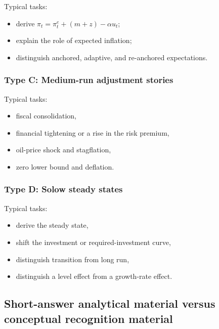 \documentclass[12pt]{article}
\begin{document}
Typical tasks:
\begin{itemize}[leftmargin=1.5em]
\item derive \(\pi_t=\pi_t^e+(m+z)-\alpha u_t\);
\item explain the role of expected inflation;
\item distinguish anchored, adaptive, and re-anchored expectations.
\end{itemize}

\subsubsection*{Type C: Medium-run adjustment stories}

Typical tasks:
\begin{itemize}[leftmargin=1.5em]
\item fiscal consolidation,
\item financial tightening or a rise in the risk premium,
\item oil-price shock and stagflation,
\item zero lower bound and deflation.
\end{itemize}

\subsubsection*{Type D: Solow steady states}

Typical tasks:
\begin{itemize}[leftmargin=1.5em]
\item derive the steady state,
\item shift the investment or required-investment curve,
\item distinguish transition from long run,
\item distinguish a level effect from a growth-rate effect.
\end{itemize}

\subsection{Short-answer analytical material versus conceptual recognition material}
\end{document}
